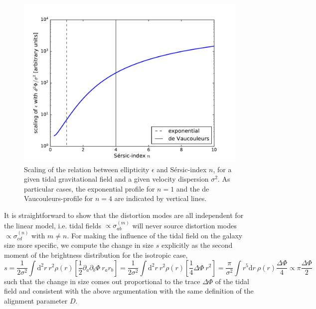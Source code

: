 \documentclass[a4paper,fleqn,usenatbib]{mnras}
\newcommand{\dd}{\mathrm{d}}
\begin{document}
\begin{figure}
\centering
\includegraphics[scale=0.45]{./figures/sersic_scaling.pdf}
\caption{Scaling of the relation between ellipticity $\epsilon$ and S{\'e}rsic-index $n$, for a given tidal gravitational field and a given velocity dispersion $\sigma^2$. As particular cases, the exponential profile for $n=1$ and the de Vaucouleurs-profile for $n=4$ are indicated by vertical lines.}
\label{fig_sersic_scaling}
\end{figure}

It is straightforward to show that the distortion modes are all independent for the linear model, i.e. tidal fields $\propto\sigma^{(m)}_{ab}$ will never source distortion modes $\propto\sigma^{(n)}_{cd}$ with $m\neq n$. For making the influence of the tidal field on the galaxy size more specific, we compute the change in size $s$ explicitly as the second moment of the brightness distribution for the isotropic case,
\begin{equation}
s = 
\frac{1}{2\sigma^2}\int\dd^2r\:r^2\rho(r)\left[\frac{1}{2}\partial_a\partial_b\Phi\: r_ar_b\right] =
\frac{1}{2\sigma^2}\int\dd^2r\:r^2\rho(r)\left[\frac{1}{4}\Delta\Phi\:r^2\right] = 
\frac{\pi}{\sigma^2}\int r^5\dd r\:\rho(r)\frac{\Delta\Phi}{4} \propto \pi\frac{\Delta\Phi}{2}
\end{equation}
such that the change in size comes out proportional to the trace $\Delta\Phi$ of the tidal field and consistent with the above argumentation with the same definition of the alignment parameter $D$. 
\end{document}
